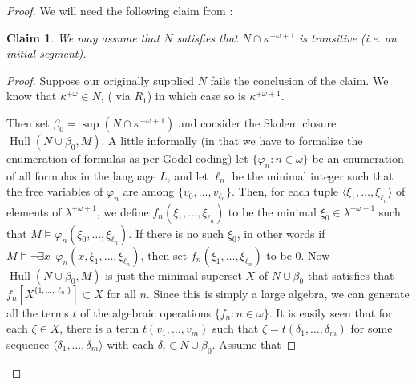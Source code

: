 \documentclass{rmmcart}
\theoremstyle{plain}
\theoremstyle{definition}
\theoremstyle{remark}
\theoremstyle{plain}
\newtheorem*{claim*}{Claim}
\theoremstyle{definition}
\theoremstyle{remark}
\begin{document}
\begin{proof}
            We will need the following claim from \cite{MR1045371}:

            \begin{claim*} We may assume that $N$ satisfies that
             $N\cap \kappa^{+\omega+1}$ is transitive (i.e. an initial segment).
            \end{claim*}

            \bgroup
            \def\proofname{Proof of Claim:\/}

            \begin{proof}
            Suppose  our originally supplied $N$ fails the conclusion of the
            claim.
            We   know that $\kappa^{+\omega}\in N$,
            (  via $R_1$)
            in which case so is $\kappa^{+\omega+1}$.


            Then set $\beta_0 = \sup(N\cap \kappa^{+\omega+1})$ and consider the
            Skolem closure $\mathop{Hull}(N\cup \beta_0, M)$.  A little informally
            (in that we have to formalize the enumeration of formulas as per
            G\"odel coding)
            let $\{\varphi_n : n\in \omega\}$ be an enumeration of all formulas
            in the language $L$, and let  $\ell_n$ be the minimal integer such
            that the free variables of $\varphi_n$ are among
             $\{ v_0, \ldots, v_{\ell_n}\}$.
            Then,   for each tuple
            $\langle \xi_1,\ldots, \xi_{\ell_n} \rangle$
            of elements of $\lambda^{+\omega+1}$,
             we define $f_n(\xi_1,\ldots, \xi_{\ell_n})$ to be
             the minimal $\xi_0\in \lambda^{+\omega+1}$ such that
             $M\models \varphi_n(\xi_0,\ldots, \xi_{\ell_n})$.
            If there is no such $\xi_0$,
               in other words if $M\models \lnot\exists x~~  \varphi_n(x,\xi_1,
            \ldots,\xi_{\ell_n})$, then set
             $f_n(\xi_1,\ldots, \xi_{\ell_n})$ to be $0$.
            Now $\mathop{Hull}(N\cup \beta_0,M)$ is just the minimal superset
             $X$
            of $N\cup \beta_0$ that satisfies that
             $f_n[X^{\{1,\ldots,\ell_n\}}] \subset X$ for all $n$. Since this is
             simply a large algebra, we can generate all the terms $t$ of
            the algebraic operations $\{ f_n : n\in \omega\}$.
            It is easily seen that for each $\zeta \in X$, there is a term
            $t(v_1,\ldots, v_m)$ such that $\zeta  = t(\delta_1,\ldots, \delta_m)$
             for some sequence $\langle \delta_1,\ldots, \delta_m\rangle$ with
             each $\delta_i\in  N\cup \beta_0$.
             Assume that

\end{proof}
\end{proof}
\end{document}
